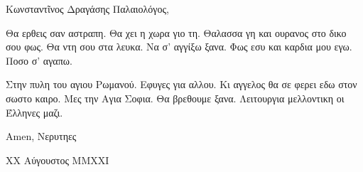 \documentclass[a4paper,11pt]{article}
\begin{document}
    \rmfamily




    Κωνσταντῖνος Δραγάσης Παλαιολόγος,
    \vspace{1em}


    \lipsum[1]

    \lipsum[2]

    Θα ερθεις σαν αστραπη. Θα χει η χωρα γιο τη. Θαλασσα γη και ουρανος στο δικο σου φως.
    Θα ντη σου στα λευκα. Να σ' αγγίξω ξανα. Φως εσυ και καρδια μου εγω. Ποσο σ' αγαπω.

    Στην πυλη του αγιου Ρωμανού. Εφυγες για αλλου. Κι αγγελος θα σε φερει εδω στον σωστο καιρο.
    Μες την Αγια Σοφια. Θα βρεθουμε ξανα. Λειτουργια μελλοντικη οι Έλληνες μαζι.

        


    \vspace{1em}
    Amen,\linebreak
    Νερυτηες

    {\footnotesize XX Αύγουστος MMXXI}
\end{document}
